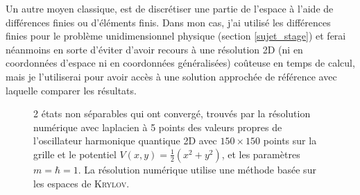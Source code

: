 \documentclass[svgnames,dvipsnames,a4paper,10pt,french]{report}
\begin{document}
Un autre moyen classique, est de discrétiser une partie de l'espace à l'aide de différences finies ou d'éléments finis. Dans mon cas, j'ai utilisé les différences finies pour le problème unidimensionnel physique (section \ref{sujet_stage})  et ferai néanmoins en sorte d'éviter d'avoir recours à une résolution 2D (ni en coordonnées d'espace ni en coordonnées généralisées) coûteuse en temps de calcul, mais je l'utiliserai pour avoir accès à une solution approchée de référence avec laquelle comparer les résultats. 






\begin{figure}[H]
    \centering
    \qquad
    \caption[Exemples de cas séparables numériquement exhibés pour l'OHQ2D]{2 états non séparables qui ont convergé, trouvés par la résolution numérique avec laplacien à 5 points des valeurs propres de l'oscillateur harmonique quantique 2D avec $150 \times 150$ points sur la grille et le potentiel $V(x,y) = \frac{1}{2}(x^2+y^2)$, et les paramètres $m=\hbar = 1$. La résolution numérique utilise une méthode basée sur les espaces de \textsc{Krylov}.}%
    \label{fig:modes_non_separables}%
\end{figure}
\end{document}
